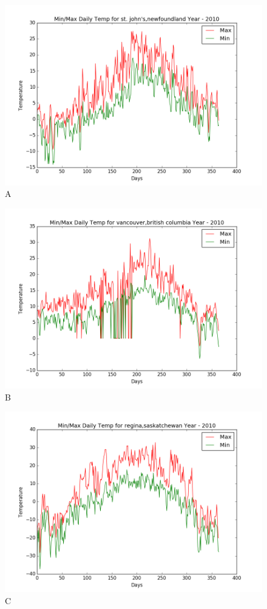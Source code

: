 \documentclass[12pt,letterpaper]{article}
\begin{document}
\begin{figure}
\centering
\includegraphics[scale=0.6]{Plot00.png}
\caption{A}
\end{figure}


\begin{figure}
\centering
\includegraphics[scale=0.6]{Plot01.png}
\caption{B}
\end{figure}

\begin{figure}
\centering
\includegraphics[scale=0.6]{Plot02.png}
\caption{C}
\end{figure}
\end{document}
